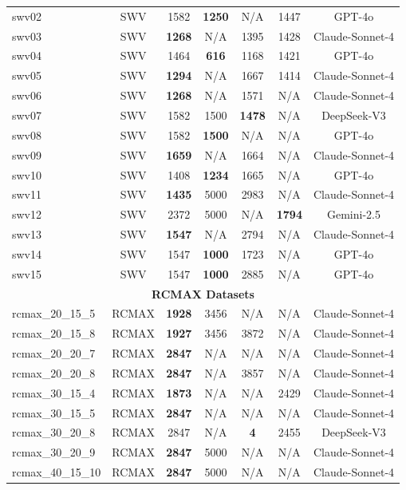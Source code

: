 \documentclass{article}
\begin{document}
\begin{table}[h!]
{\begin{tabular}{@{}lcccccc@{}}
swv02 & SWV & 1582 & \textbf{1250} & N/A & 1447 & GPT-4o \\
swv03 & SWV & \textbf{1268} & N/A & 1395 & 1428 & Claude-Sonnet-4 \\
swv04 & SWV & 1464 & \textbf{616} & 1168 & 1421 & GPT-4o \\
swv05 & SWV & \textbf{1294} & N/A & 1667 & 1414 & Claude-Sonnet-4 \\
swv06 & SWV & \textbf{1268} & N/A & 1571 & N/A & Claude-Sonnet-4 \\
swv07 & SWV & 1582 & 1500 & \textbf{1478} & N/A & DeepSeek-V3 \\
swv08 & SWV & 1582 & \textbf{1500} & N/A & N/A & GPT-4o \\
swv09 & SWV & \textbf{1659} & N/A & 1664 & N/A & Claude-Sonnet-4 \\
swv10 & SWV & 1408 & \textbf{1234} & 1665 & N/A & GPT-4o \\
swv11 & SWV & \textbf{1435} & 5000 & 2983 & N/A & Claude-Sonnet-4 \\
swv12 & SWV & 2372 & 5000 & N/A & \textbf{1794} & Gemini-2.5 \\
swv13 & SWV & \textbf{1547} & N/A & 2794 & N/A & Claude-Sonnet-4 \\
swv14 & SWV & 1547 & \textbf{1000} & 1723 & N/A & GPT-4o \\
swv15 & SWV & 1547 & \textbf{1000} & 2885 & N/A & GPT-4o \\
\midrule
\multicolumn{7}{c}{\textbf{RCMAX Datasets}} \\
rcmax\_20\_15\_5 & RCMAX & \textbf{1928} & 3456 & N/A & N/A & Claude-Sonnet-4 \\
rcmax\_20\_15\_8 & RCMAX & \textbf{1927} & 3456 & 3872 & N/A & Claude-Sonnet-4 \\
rcmax\_20\_20\_7 & RCMAX & \textbf{2847} & N/A & N/A & N/A & Claude-Sonnet-4 \\
rcmax\_20\_20\_8 & RCMAX & \textbf{2847} & N/A & 3857 & N/A & Claude-Sonnet-4 \\
rcmax\_30\_15\_4 & RCMAX & \textbf{1873} & N/A & N/A & 2429 & Claude-Sonnet-4 \\
rcmax\_30\_15\_5 & RCMAX & \textbf{2847} & N/A & N/A & N/A & Claude-Sonnet-4 \\
rcmax\_30\_20\_8 & RCMAX & 2847 & N/A & \textbf{4} & 2455 & DeepSeek-V3 \\
rcmax\_30\_20\_9 & RCMAX & \textbf{2847} & 5000 & N/A & N/A & Claude-Sonnet-4 \\
rcmax\_40\_15\_10 & RCMAX & \textbf{2847} & 5000 & N/A & N/A & Claude-Sonnet-4 \\

\end{tabular}}
\end{table}
\end{document}
